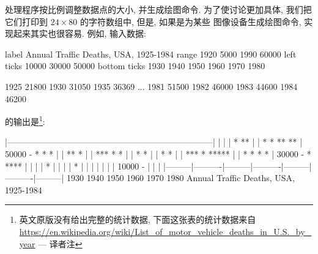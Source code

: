 处理程序按比例调整数据点的大小, 并生成绘图命令. 为了使讨论更加具体,
我们把它们打印到 $24 \times 80$ 的字符数组中, 但是, 如果是为某些
图像设备生成绘图命令, 实现起来其实也很容易. 例如, 输入数据:
\begin{file}
    label Annual Traffic Deaths, USA, 1925-1984
    range 1920 5000 1990 60000
    left ticks 10000 30000 50000
    bottom ticks 1930 1940 1950 1960 1970 1980

    1925 21800
    1930 31050
    1935 36369
    ...
    1981 51500
    1982 46000
    1983 44600
    1984 46200
\end{file}
的输出是\footnote{英文原版没有给出完整的统计数据, 下面这张表的统计数据来自
    \url{https://en.wikipedia.org/wiki/List_of_motor_vehicle_deaths_in_U.S._by_year}
 --- 译者注}:
{\small
\begin{file}
      |------------------------------------------------------------------------|
      |                                                                        |
      |                                                  *  **                 |
      |                                               * * **        **         |
50000 -                                                *          *   *        |
      |                                             **           *             |
      |                                                       ***      * *     |
      |                                            *                    *      |
      |                                     *     *                            |
      |                               ***  * *****                             |
      |               *    *         *   *                                     |
30000 -         *                ****                                          |
      |                                                                        |
      |                         *                                              |
      |                                                                        |
      |    *                                                                   |
      |                                                                        |
      |                                                                        |
      |                                                                        |
10000 -                                                                        |
      |                                                                        |
      |---------|----------|---------|----------|---------|----------|---------|
               1930       1940      1950       1960      1970       1980        
                        Annual Traffic Deaths, USA, 1925-1984                   
\end{file}
}

